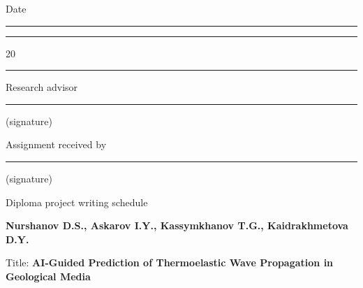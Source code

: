 \vspace{8mm}
\noindent Date \guillemotleft{}\rule{1cm}{0.1pt}\guillemotright{}\rule{2cm}{0.1pt}20\rule{0.6cm}{0.1pt}

\vspace{4mm}
\noindent Research advisor \hfill \rule{7cm}{0.1pt}

\hfill \small{(signature)}

\vspace{2mm}
\noindent Assignment received by \hfill \rule{7cm}{0.1pt}

\hfill \small{(signature)}

\newpage
\thispagestyle{empty}
\enlargethispage{10mm}

\begin{center}
{Diploma project writing schedule}

\vspace{3mm}
\textbf{Nurshanov D.S., Askarov I.Y., Kassymkhanov T.G., Kaidrakhmetova D.Y.}

\vspace{3mm}
\noindent Title: \textbf{AI-Guided Prediction of Thermoelastic Wave Propagation in Geological Media}
\end{center}

